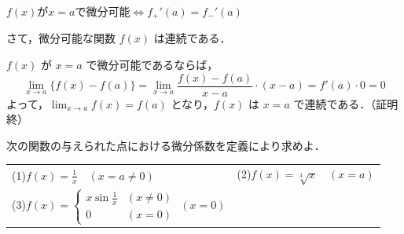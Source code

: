 \begin{shadebox}
\centering
$f(x)$が$x=a$で微分可能\quad$\Longleftrightarrow$\quad$f_{+}'(a)=f_{-}'(a)$
\end{shadebox}
\pagebreak[3]

さて，微分可能な関数 $f(x)$ は連続である．

\begin{証明}$f(x)$ が $x=a$ で微分可能であるならば，
\[
\lim_{x\rightarrow a}\{f(x)-f(a)\}=\lim_{x\rightarrow a}\frac{f(x)-f(a)}{x-a}\cdot(x-a)=f'(a)\cdot 0=0
\]
よって，$\lim_{x\rightarrow a}f(x)=f(a)$ となり，$f(x)$ は $x=a$ で連続である．\hfill（証明終）
\end{証明}

\begin{例題}
次の関数の与えられた点における微分係数を定義により求めよ．\par
\begin{longtable}[l]{@{}ll}
(1)\quad$f(x)=\frac{1}{x}\quad (x=a\neq 0)$ &(2)\quad$f(x)=\sqrt[3]{x}\quad (x=a)$ \\[3mm]
(3)\quad$f(x)=\left\{\begin{array}{ll}
x\sin\frac{1}{x} & (x\neq 0)\\
0 & (x=0)
\end{array}\right.$
\quad$(x=0)$
\end{longtable}
\end{例題}

